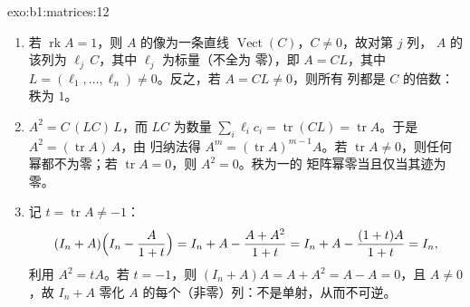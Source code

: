 \begin{solution}{exo:b1:matrices:12}
\begin{enumerate}
  \item 若 $\operatorname{rk} A = 1$，则 $A$ 的像为一条直线
        $\operatorname{Vect}(C)$，$C \neq 0$，故对第 $j$ 列，
        $A$ 的该列为 $\ell_j\,C$，其中 $\ell_j$ 为标量（不全为
        零），即 $A = C L$，其中 $L = (\ell_1, \dots,
        \ell_n) \neq 0$。反之，若 $A = CL \neq 0$，则所有
        列都是 $C$ 的倍数：秩为 $1$。
  \item $A^2 = C\,(L C)\,L$，而 $LC$ 为数量 $\sum_i
        \ell_i c_i = \operatorname{tr}(CL) = \operatorname{tr}
        A$。于是 $A^2 = (\operatorname{tr} A)\,A$，由
        归纳法得 $A^m = (\operatorname{tr} A)^{m-1} A$。若
        $\operatorname{tr} A \neq 0$，则任何幂都不为零；若
        $\operatorname{tr} A = 0$，则 $A^2 = 0$。秩为一的
        矩阵幂零当且仅当其迹为零。
  \item 记 $t = \operatorname{tr} A \neq -1$：
        \[
        (I_n + A)\Bigl(I_n - \frac{A}{1 + t}\Bigr)
        = I_n + A - \frac{A + A^2}{1 + t}
        = I_n + A - \frac{(1 + t)A}{1 + t} = I_n ,
        \]
        利用 $A^2 = tA$。若 $t = -1$，则 $(I_n + A)A = A + A^2 = A
        - A = 0$，且 $A \neq 0$，故 $I_n + A$ 零化
        $A$ 的每个（非零）列：不是单射，从而不可逆。
\end{enumerate}
\end{solution}

